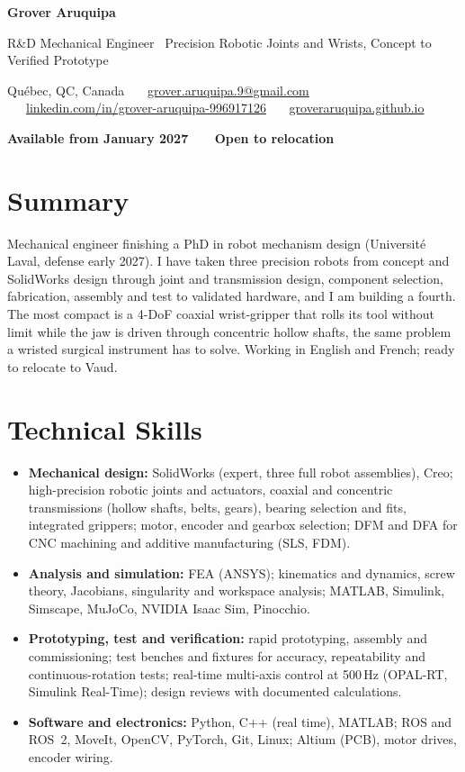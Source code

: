 \documentclass[10pt,a4paper]{article}
\begin{document}
{\LARGE\bfseries Grover Aruquipa}\par\vspace{2pt}
{\large R\&D Mechanical Engineer \textbar\ Precision Robotic Joints and Wrists, Concept to Verified Prototype}\par\vspace{3pt}
{\small Qu\'ebec, QC, Canada \ \textbullet\ \
\href{mailto:grover.aruquipa.9@gmail.com}{grover.aruquipa.9@gmail.com} \ \textbullet\ \
\href{https://www.linkedin.com/in/grover-aruquipa-996917126}{linkedin.com/in/grover-aruquipa-996917126} \ \textbullet\ \
\href{https://groveraruquipa.github.io}{groveraruquipa.github.io}}\par\vspace{1pt}
{\small\bfseries Available from January 2027 \ \textbullet\ \ Open to relocation}\par


\section{Summary}
Mechanical engineer finishing a PhD in robot mechanism design (Universit\'e Laval, defense early 2027). I have taken three
precision robots from concept and SolidWorks design through joint and transmission design, component selection,
fabrication, assembly and test to validated hardware, and I am building a fourth. The most compact is a 4-DoF coaxial
wrist-gripper that rolls its tool without limit while the jaw is driven through concentric hollow shafts, the same
problem a wristed surgical instrument has to solve. Working in English and French; ready to relocate to Vaud.

\section{Technical Skills}
\begin{itemize}
\item \textbf{Mechanical design:} SolidWorks (expert, three full robot assemblies), Creo; high-precision robotic joints
and actuators, coaxial and concentric transmissions (hollow shafts, belts, gears), bearing selection and fits, integrated
grippers; motor, encoder and gearbox selection; DFM and DFA for CNC machining and additive manufacturing (SLS, FDM).
\item \textbf{Analysis and simulation:} FEA (ANSYS); kinematics and dynamics, screw theory, Jacobians, singularity and
workspace analysis; MATLAB, Simulink, Simscape, MuJoCo, NVIDIA Isaac Sim, Pinocchio.
\item \textbf{Prototyping, test and verification:} rapid prototyping, assembly and commissioning; test benches and
fixtures for accuracy, repeatability and continuous-rotation tests; real-time multi-axis control at 500\,Hz (OPAL-RT,
Simulink Real-Time); design reviews with documented calculations.
\item \textbf{Software and electronics:} Python, C++ (real time), MATLAB; ROS and ROS~2, MoveIt, OpenCV, PyTorch, Git,
Linux; Altium (PCB), motor drives, encoder wiring.
\end{itemize}
\end{document}
